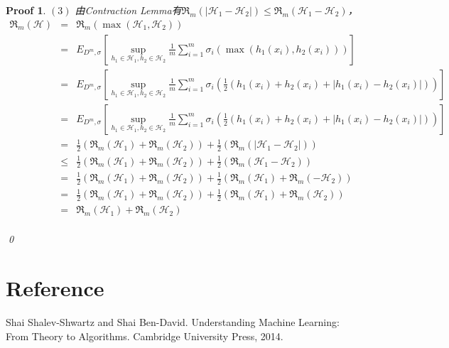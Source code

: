 \documentclass[a4paper,UTF8]{article}
\numberwithin{equation}{section}
\newtheorem*{myProof}{Proof}
\begin{document}
\begin{myProof}
$(3)$ 由Contraction Lemma有$\mathfrak{R}_m(|\mathcal{H}_1 - \mathcal{H}_2|) \le \mathfrak{R}_m(\mathcal{H}_1 - \mathcal{H}_2)$，
\begin{eqnarray*}
\mathfrak{R}_m(\mathcal{H}) &=& \mathfrak{R}_m(\max(\mathcal{H}_1, \mathcal{H}_2)) \\
&=& E_{D^m, \sigma}[\sup_{h_1 \in \mathcal{H}_1, h_2 \in \mathcal{H}_2} \frac{1}{m} \sum_{i=1}^m \sigma_i \left( \max(h_1(x_i), h_2(x_i)) \right)] \\
&=& E_{D^m, \sigma}[\sup_{h_1 \in \mathcal{H}_1, h_2 \in \mathcal{H}_2} \frac{1}{m} \sum_{i=1}^m \sigma_i \left( \frac{1}{2} (h_1(x_i) + h_2(x_i) + |h_1(x_i) - h_2(x_i)| ) \right)] \\
&=& E_{D^m, \sigma}[\sup_{h_1 \in \mathcal{H}_1, h_2 \in \mathcal{H}_2} \frac{1}{m} \sum_{i=1}^m \sigma_i \left( \frac{1}{2} (h_1(x_i) + h_2(x_i) + |h_1(x_i) - h_2(x_i)| ) \right)] \\
&=& \frac{1}{2} \left( \mathfrak{R}_m(\mathcal{H}_1) + \mathfrak{R}_m(\mathcal{H}_2) \right) + \frac{1}{2} \left( \mathfrak{R}_m(|\mathcal{H}_1 - \mathcal{H}_2 | ) \right) \\
&\le& \frac{1}{2} \left( \mathfrak{R}_m(\mathcal{H}_1) + \mathfrak{R}_m(\mathcal{H}_2) \right) + \frac{1}{2} \left( \mathfrak{R}_m(\mathcal{H}_1 - \mathcal{H}_2) \right) \\
&=& \frac{1}{2} \left( \mathfrak{R}_m(\mathcal{H}_1) + \mathfrak{R}_m(\mathcal{H}_2) \right) + \frac{1}{2} \left( \mathfrak{R}_m(\mathcal{H}_1) + \mathfrak{R}_m(- \mathcal{H}_2) \right) \\
&=& \frac{1}{2} \left( \mathfrak{R}_m(\mathcal{H}_1) + \mathfrak{R}_m(\mathcal{H}_2) \right) + \frac{1}{2} \left( \mathfrak{R}_m(\mathcal{H}_1) + \mathfrak{R}_m( \mathcal{H}_2) \right) \\
&=& \mathfrak{R}_m(\mathcal{H}_1) + \mathfrak{R}_m(\mathcal{H}_2) \\
\end{eqnarray*}

\qed
\end{myProof}

\newpage
\section*{Reference}
\begin{enumerate}[ {[}1{]}]
\item Shai Shalev-Shwartz and Shai Ben-David. Understanding Machine Learning: From Theory to Algorithms. Cambridge University Press, 2014.
\end{enumerate}
\end{document}
